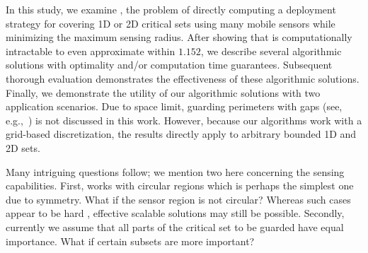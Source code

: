 In this study, we examine \osgt, the problem of directly computing a deployment 
strategy for covering 1D or 2D critical sets using many mobile sensors while 
minimizing the maximum sensing radius. After showing that \osgt is computationally 
intractable to even approximate within $1.152$, we describe several 
algorithmic solutions with optimality and/or computation time guarantees. 
Subsequent thorough evaluation demonstrates the effectiveness of these algorithmic 
solutions. Finally, we demonstrate the utility of our algorithmic solutions with 
two application scenarios. 
%
Due to space limit, guarding perimeters with gaps (see, e.g.,~\cite{fenghangaoyu2019efficient}) 
is not discussed in this work. However, because our algorithms work with a 
grid-based discretization, the results directly apply to arbitrary bounded 1D and 2D 
sets. 

Many intriguing questions follow; we mention two here concerning the sensing 
capabilities. First, \osgt works with circular regions which is perhaps the simplest one
due to symmetry. What if the sensor region is not circular? Whereas such cases 
appear to be hard \cite{culberson1988covering}, effective scalable solutions may 
still be possible. Secondly, currently we assume that all parts of the critical 
set to be guarded have equal importance. What if certain subsets are more important? 


